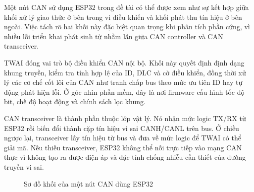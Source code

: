 Một nút CAN sử dụng ESP32 trong đề tài có thể được xem như sự kết hợp giữa khối xử lý
giao thức ở bên trong vi điều khiển và khối phát thu tín hiệu ở bên ngoài. Việc tách rõ hai
khối này đặc biệt quan trọng khi phân tích phần cứng, vì nhiều lỗi triển khai phát sinh từ
nhầm lẫn giữa CAN controller và CAN transceiver.


TWAI đóng vai trò bộ điều khiển CAN nội bộ. Khối này quyết định định dạng khung truyền,
kiểm tra tính hợp lệ của ID, DLC và cờ điều khiển, đồng thời xử lý các cơ chế cốt lõi của
CAN như tranh chấp bus theo mức ưu tiên ID hay tự động phát hiện lỗi. Ở góc nhìn phần
mềm, đây là nơi firmware cấu hình tốc độ bit, chế độ hoạt động và chính sách lọc khung.


CAN transceiver là thành phần thuộc lớp vật lý. Nó nhận mức logic TX/RX từ ESP32 rồi
biến đổi thành cặp tín hiệu vi sai CANH/CANL trên bus. Ở chiều ngược lại, transceiver lấy
tín hiệu từ bus và đưa về mức logic để TWAI có thể giải mã. Nếu thiếu transceiver, ESP32
không thể nối trực tiếp vào mạng CAN thực vì không tạo ra được điện áp và đặc tính chống
nhiễu cần thiết của đường truyền vi sai.

\begin{figure}[H]
\centering
{}
\caption{Sơ đồ khối của một nút CAN dùng ESP32}
\end{figure}


